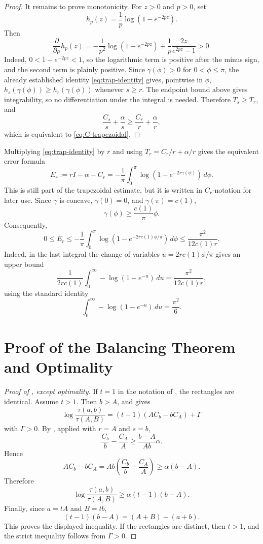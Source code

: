 \documentclass[11pt]{article}
\numberwithin{equation}{section}
\newcommand{\dd}{\,d}
\begin{document}
\begin{proof}
It remains to prove monotonicity. For $z>0$ and $p>0$, set
\[
  h_p(z)=\frac1p\log(1-e^{-2pz}).
\]
Then
\[
  \frac{\partial}{\partial p}h_p(z)
  =
  -\frac1{p^2}\log(1-e^{-2pz})
  +
  \frac1p\frac{2z}{e^{2pz}-1}
  >0.
\]
Indeed, $0<1-e^{-2pz}<1$, so the logarithmic term is positive after the minus sign, and the second term is plainly positive. Since $\gamma(\phi)>0$ for $0<\phi\le\pi$, the already established identity \eqref{eq:trap-identity} gives, pointwise in $\phi$, $h_s(\gamma(\phi))\ge h_r(\gamma(\phi))$ whenever $s\ge r$. The endpoint bound above gives integrability, so no differentiation under the integral is needed. Therefore $T_s\ge T_r$, and
\[
  \frac{C_s}{s}+\frac{\alpha}{s}
  \ge
  \frac{C_r}{r}+\frac{\alpha}{r},
\]
which is equivalent to \eqref{eq:C-trapezoidal}.
\end{proof}

Multiplying \eqref{eq:trap-identity} by $r$ and using
$T_r=C_r/r+\alpha/r$ gives the equivalent error formula
\begin{equation}\label{eq:C-error}
  E_r:=rI-\alpha-C_r
  =
  -\frac1\pi
  \int_0^\pi
  \log\left(1-e^{-2r\gamma(\phi)}\right)\dd\phi.
\end{equation}
This is still part of the trapezoidal estimate, but it is written in $C_r$-notation for later use.
Since $\gamma$ is concave, $\gamma(0)=0$, and $\gamma(\pi)=c(1)$,
\[
  \gamma(\phi)\ge \frac{c(1)}{\pi}\phi.
\]
Consequently,
\begin{equation}\label{eq:C-error-bound}
  0\le E_r
  \le
  -\frac1\pi
  \int_0^\pi
  \log\left(1-e^{-2r c(1)\phi/\pi}\right)\dd\phi
  \le
  \frac{\pi^2}{12c(1)r}.
\end{equation}
Indeed, in the last integral the change of variables $u=2rc(1)\phi/\pi$ gives an upper bound
\[
  \frac{1}{2rc(1)}
  \int_0^\infty -\log(1-e^{-u})\dd u
  =
  \frac{\pi^2}{12c(1)r},
\]
using the standard identity
\[
  \int_0^\infty -\log(1-e^{-u})\dd u=\frac{\pi^2}{6}.
\]

\section{Proof of the Balancing Theorem and Optimality}\label{sec:proof-optimality}

\begin{proof}[Proof of , except optimality]
If $t=1$ in the notation of , the rectangles are identical. Assume $t>1$. Then $b>A$, and  gives
\[
  \log\frac{\tau(a,b)}{\tau(A,B)}
  =
  (t-1)(AC_b-bC_A)+\Gamma
\]
with $\Gamma>0$. By , applied with $r=A$ and $s=b$,
\[
  \frac{C_b}{b}-\frac{C_A}{A}
  \ge
  \frac{b-A}{Ab}\alpha.
\]
Hence
\[
  AC_b-bC_A
  =
  Ab\left(\frac{C_b}{b}-\frac{C_A}{A}\right)
  \ge
  \alpha(b-A).
\]
Therefore
\[
  \log\frac{\tau(a,b)}{\tau(A,B)}
  \ge
  \alpha(t-1)(b-A).
\]
Finally, since $a=tA$ and $B=tb$,
\[
  (t-1)(b-A)
  =
  (A+B)-(a+b).
\]
This proves the displayed inequality. If the rectangles are distinct, then $t>1$, and the strict inequality follows from $\Gamma>0$.
\end{proof}
\end{document}
